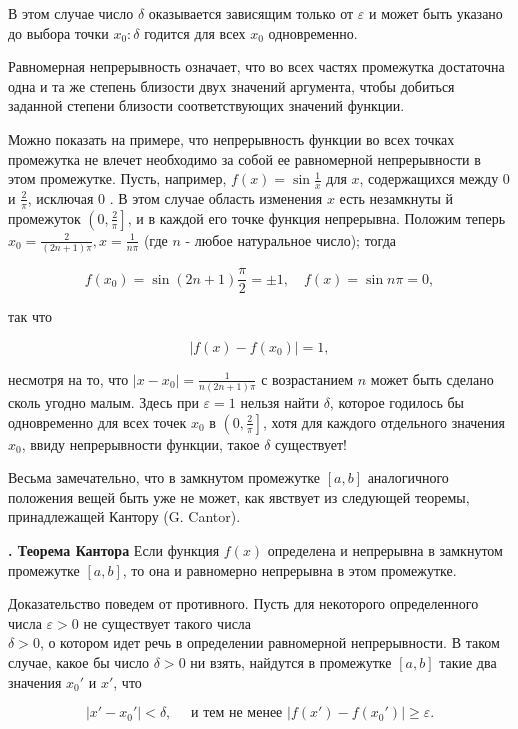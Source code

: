 \documentclass[10pt, twoside]{article}
\newcounter{subtopic}
\newcommand{\subtopic}[1]{%
  \stepcounter{subtopic}%
  \gdef\thesubtopic{\arabic{subtopic}}
  \textbf{\arabic{subtopic}. #1}
}
\begin{document}
В этом случае число $\delta$ оказывается зависящим только от $\varepsilon$ и может быть указано до выбора точки $x_{0}: \delta$ годится для всех $x_{0}$ одновременно.

Равномерная непрерывность означает, что во всех частях промежутка достаточна одна и та же степень близости двух значений аргумента, чтобы добиться заданной степени близости соответствующих значений функции.

Можно показать на примере, что непрерывность функции во всех точках промежутка не влечет необходимо за собой ее равномерной непрерывности в этом промежутке. Пусть, например, $f(x)=\sin \frac{1}{x}$ для $x$, содержащихся между $0$ и $\frac{2}{\pi}$, исключая $0$ . В этом случае область изменения $x$ есть незамкнуты й промежуток $\left(0, \frac{2}{\pi}\right]$, и в каждой его точке функция непрерывна. Положим теперь $x_{0}=\frac{2}{(2 n+1) \pi}, x=\frac{1}{n \pi}$ (где $n$ - любое натуральное число); тогда

$$
  f\left(x_{0}\right)=\sin (2 n+1) \frac{\pi}{2}= \pm 1, \quad f(x)=\sin n \pi=0,
$$

так что

$$
  \left|f(x)-f\left(x_{0}\right)\right|=1,
$$

несмотря на то, что $\left|x-x_{0}\right|=\frac{1}{n(2 n+1) \pi}$ с возрастанием $n$ может быть сделано сколь угодно малым. Здесь при $\varepsilon=1$ нельзя найти $\delta$, которое годилось бы одновременно для всех точек $x_{0}$ в $\left(0, \frac{2}{\pi}\right]$, хотя для каждого отдельного значения $x_{0}$, ввиду непрерывности функции, такое $\delta$ существует!

Весьма замечательно, что в замкнутом промежутке $[a, b]$ аналогичного положения вещей быть уже не может, как явствует из следующей теоремы, принадлежащей Кантору (G. Cantor).

\subtopic{Теорема Кантора} Если функция $f(x)$ определена и непрерывна в замкнутом промежутке $[a, b]$, то она и равномерно непрерывна в этом промежутке.

Доказательство поведем от противного. Пусть для некоторого определенного числа $\varepsilon>0$ не существует такого числа\\
$\delta>0$, о котором идет речь в определении равномерной непрерывности. В таком случае, какое бы число $\delta>0$ ни взять, найдутся в промежутке $[a, b]$ такие два значения $x_{0}'$ и $x'$, что

$$
  \left|x'-x_{0}'\right|<\delta, \quad \text { и тем не менее }\left|f\left(x'\right)-f\left(x_{0}'\right)\right| \geqslant \varepsilon .
$$
\end{document}
